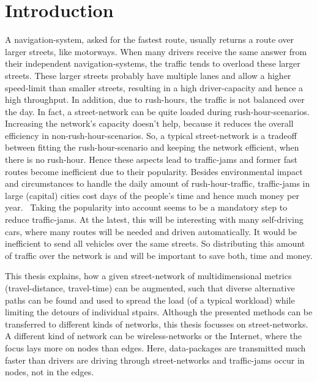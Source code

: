 \chapter{Introduction}
\label{chap:introduction}

A navigation-system, asked for the fastest route, usually returns a route over larger streets, like motorways.
When many drivers receive the same answer from their independent navigation-systems, the traffic tends to overload these larger streets.
These larger streets probably have multiple lanes and allow a higher speed-limit than smaller streets, resulting in a high driver-capacity and hence a high throughput.
In addition, due to rush-hours, the traffic is not balanced over the day.
In fact, a street-network can be quite loaded during rush-hour-scenarios.
Increasing the network's capacity doesn't help, because it reduces the overall efficiency in non-rush-hour-scenarios.
So, a typical street-network is a tradeoff between fitting the rush-hour-scenario and keeping the network efficient, when there is no rush-hour.
Hence these aspects lead to traffic-jams and former fast routes become inefficient due to their popularity.
Besides environmental impact and circumstances to handle the daily amount of rush-hour-traffic, traffic-jams in large (capital) cities cost days of the people's time and hence much money per year.~\cite{inrix:traffic-cost}
Taking the popularity into account seems to be a mandatory step to reduce traffic-jams.
At the latest, this will be interesting with many self-driving cars, where many routes will be needed and driven automatically.
It would be inefficient to send all vehicles over the same streets.
So distributing this amount of traffic over the network is and will be important to save both, time and money.

This thesis explains, how a given street-network of multidimensional \glspl{metric} (travel-distance, travel-time) can be augmented, such that diverse alternative paths can be found and used to spread the load (of a typical workload) while limiting the detours of individual \glspl{stpair}.
Although the presented methods can be transferred to different kinds of networks, this thesis focusses on street-networks.
A different kind of network can be wireless-networks or the Internet, where the focus lays more on nodes than edges.
Here, data-packages are transmitted much faster than drivers are driving through street-networks and traffic-jams occur in nodes, not in the edges.

